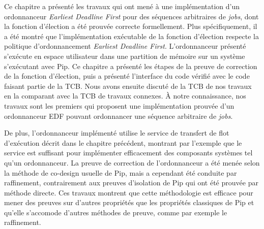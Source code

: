 	Ce chapitre a présenté les travaux qui ont mené à une implémentation d'un ordonnanceur \emph{Earliest Deadline First} pour des séquences arbitraires de \emph{jobs}, dont la fonction d'élection a été prouvée correcte formellement. Plus spécifiquement, il a été montré que l'implémentation exécutable de la fonction d'élection respecte la politique d'ordonnancement \emph{Earliest Deadline First}. L'ordonnanceur présenté s'exécute en espace utilisateur dans une partition de mémoire sur un système s'exécutant avec Pip. Ce chapitre a présenté les étapes de la preuve de correction de la fonction d'élection, puis a présenté l'interface du code vérifié avec le code faisant partie de la TCB. Nous avons ensuite discuté de la TCB de nos travaux en la comparant avec la TCB de travaux connexes. À notre connaissance, nos travaux sont les premiers qui proposent une implémentation prouvée d'un ordonnanceur EDF pouvant ordonnancer une séquence arbitraire de \emph{jobs}.

	De plus, l'ordonnanceur implémenté utilise le service de transfert de flot d'exécution décrit dans le chapitre précédent, montrant par l'exemple que le service est suffisant pour implémenter efficacement des composants systèmes tel qu'un ordonnanceur. La preuve de correction de l'ordonnanceur a été menée selon la méthode de co-design usuelle de Pip, mais a cependant été conduite par raffinement, contrairement aux preuves d'isolation de Pip qui ont été prouvée par méthode directe. Ces travaux montrent que cette méthodologie est efficace pour mener des preuves sur d'autres propriétés que les propriétés classiques de Pip et qu'elle s'accomode d'autres méthodes de preuve, comme par exemple le raffinement.
